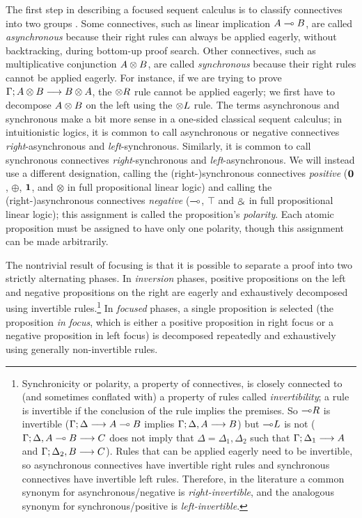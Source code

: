 The first step in describing a focused sequent calculus is to classify
connectives into two groups \cite{andreoli92logic}.  Some connectives,
such as linear implication $A \multimap B$, are called {\it asynchronous}
because their right rules can always be applied eagerly, without
backtracking, during bottom-up proof search. Other connectives, such
as multiplicative conjunction $A \otimes B$, are called {\it
  synchronous} because their right rules cannot be applied
eagerly. For instance, if we are trying to prove ${\Gamma};{A
  \otimes B} \longrightarrow {B \otimes A} \mathstrut$, the ${\otimes}R$ rule cannot be applied
eagerly; we first have to decompose $A \otimes B$ on the left using
the ${\otimes}L$ rule.  The terms asynchronous and synchronous make a
bit more sense in a one-sided classical sequent calculus; in
intuitionistic logics, it is common to call asynchronous or negative
connectives {\it right}-asynchronous and {\it
  left}-synchronous. Similarly, it is common to call synchronous
connectives {\it right}-synchronous and {\it left}-asynchronous.  We
will instead use a different designation, calling the
(right-)synchronous connectives {\it positive} ($\mathbf{0}$, $\oplus$,
$\mathbf{1}$, and $\otimes$ in full propositional linear logic) and calling
the (right-)asynchronous connectives {\it negative} ($\multimap$, $\top$
and $\mathbin{\binampersand}$ in full propositional linear logic); this assignment is
called the proposition's {\it polarity}. Each atomic proposition must
be assigned to have only one polarity, though this assignment can be
made arbitrarily.

The nontrivial result of focusing is that it is possible to separate a
proof into two strictly alternating phases. In {\it inversion} phases,
positive propositions on the left and negative propositions on the
right are eagerly and exhaustively decomposed using invertible
rules.\footnote{Synchronicity or polarity, a property of connectives,
  is closely connected to (and sometimes conflated with) a property of
  rules called {\it invertibility}; a rule is invertible if the
  conclusion of the rule implies the premises. So ${\multimap}R$ is
  invertible (${\Gamma};{\Delta} \longrightarrow {A \multimap B} \mathstrut$ implies
  ${\Gamma};{\Delta, A} \longrightarrow {B} \mathstrut$) but ${\multimap}L$ is not
  (${\Gamma};{\Delta, A \multimap B} \longrightarrow {C} \mathstrut$ does not imply that $\Delta =
  \Delta_1, \Delta_2$ such that ${\Gamma};{\Delta_1} \longrightarrow {A} \mathstrut$ and
  ${\Gamma};{\Delta_2, B} \longrightarrow {C} \mathstrut$).  Rules that can be applied eagerly
  need to be invertible, so asynchronous connectives have invertible
  right rules and synchronous connectives have invertible left
  rules. Therefore, in the literature a common synonym for
  asynchronous/negative is {\it right-invertible}, and the analogous
  synonym for synchronous/positive is {\it left-invertible}.}  In {\it
  focused} phases, a single proposition is selected (the proposition
{\it in focus}, which is either a positive proposition in right focus
or a negative proposition in left focus) is decomposed repeatedly and
exhaustively using generally non-invertible rules.

